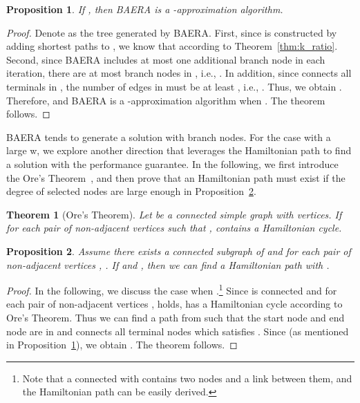 \documentclass[conference]{IEEEtran}
\newtheorem{theorem}{Theorem}
\newtheorem{proposition}{Proposition}
\begin{document}
\begin{proposition}
If , then BAERA is a -approximation algorithm.
\label{thm:2k_approx}
\end{proposition}

\begin{proof}
Denote  as the tree generated by BAERA. First, since  is constructed by adding shortest paths to , we know that  according to Theorem~\ref{thm:k_ratio}. Second, since BAERA includes at most one additional branch node in each iteration, there are at most  branch nodes in , i.e., .  In addition, since  connects all terminals in , the number of edges in  must be at least , i.e., . Thus, we obtain . Therefore,  and BAERA is a -approximation algorithm when . The theorem follows.
\end{proof}





BAERA tends to generate a solution with branch nodes. For the case with a large w, we explore another direction that leverages the Hamiltonian path to find a solution with the performance guarantee. In the following, we first introduce the Ore's Theorem~\cite{Ore1960}, and then prove that an Hamiltonian path must exist if the degree of selected nodes are large enough in  Proposition~\ref{thm:no_branch}.

\begin{theorem}[Ore's Theorem]
Let  be a connected simple graph with  vertices.
If for each pair of non-adjacent vertices
 such that ,  contains a Hamiltonian cycle.
\end{theorem}



\begin{proposition}
Assume there exists a connected subgraph  of  and for each pair of non-adjacent vertices , .
If  and , then we can find a Hamiltonian
path  with .
\label{thm:no_branch}
\end{proposition}

\begin{proof}
In the following, we discuss the case when .\footnote{Note that a connected  with  contains two nodes and a link between them, and the Hamiltonian path can be easily derived.} Since  is connected and for each pair of non-adjacent vertices ,  holds,  has a Hamiltonian cycle  according to Ore's Theorem. Thus we can find a path  from  such that the start node and end node are in  and connects all terminal nodes which satisfies . Since  (as mentioned in Proposition~\ref{thm:2k_approx}), we obtain . The theorem follows.
\end{proof}
\end{document}
